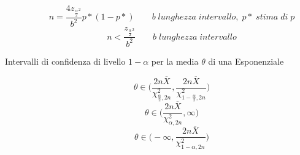 \begin{description}
	\begin{equation}
	n = \frac{4z_{\frac{\alpha}{2}^{2}}}{b^{2}} p*(1-p*) \qquad b \; lunghezza \; intervallo, \;p* \; stima \; di \; p
	\end{equation}
	\begin{equation}
	n < \frac{z_{\frac{\alpha}{2}^{2}}}{b^{2}} \qquad b \; lunghezza \; intervallo
	\end{equation}
	
	\item[Intervalli di confidenza di livello $1-\alpha$ per la media $\theta$ di una Esponenziale]
	\begin{equation}
	\theta \in \Big(\frac{2n\overline{X}}{\chi^{2}_{\frac{\alpha}{2},2n}},\frac{2n\overline{X}}{\chi^{2}_{1-\frac{\alpha}{2},2n}}\Big)
	\end{equation}
	\begin{equation}
	\theta \in \Big(\frac{2n\overline{X}}{\chi^{2}_{\alpha,2n}},\infty\Big)
	\end{equation}
	\begin{equation}
	\theta \in \Big(-\infty,\frac{2n\overline{X}}{\chi^{2}_{1-\alpha,2n}}\Big)
	\end{equation}
\end{description}